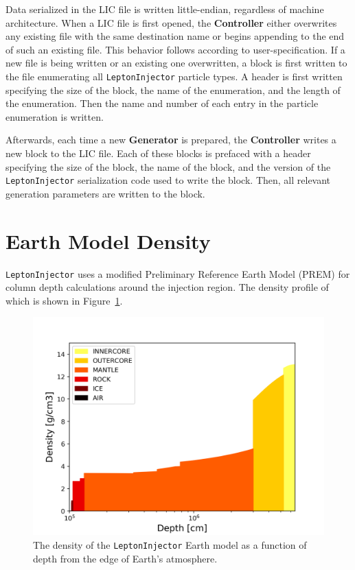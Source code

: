\documentclass[main.tex]{subfiles}
\newcommand{\LeptonInjector}{\texttt{LeptonInjector}}
\begin{document}
Data serialized in the LIC file is written little-endian, regardless of machine architecture. 
When a LIC file is first opened, the \textbf{Controller} either overwrites any existing file with the same destination name or begins appending to the end of such an existing file. 
This behavior follows according to user-specification. 
If a new file is being written or an existing one overwritten, a block is first written to the file enumerating all \LeptonInjector{} particle types. 
A header is first written specifying the size of the block, the name of the enumeration, and the length of the enumeration. 
Then the name and number of each entry in the particle enumeration is written. 

Afterwards, each time a new \textbf{Generator} is prepared, the \textbf{Controller} writes a new block to the LIC file. 
Each of these blocks is prefaced with a header specifying the size of the block, the name of the block, and the version of the \LeptonInjector{} serialization code used to write the block. 
Then, all relevant generation parameters are written to the block. 
\section{Earth Model Density\label{sec:earthdensity}}

\LeptonInjector{} uses a modified Preliminary Reference Earth Model (PREM) for column depth calculations around the injection region. The density profile of which is shown in Figure~\ref{fig:earth_density}.

\begin{figure}[th!]
    \centering
    \includegraphics[width=0.8\linewidth]{figures/earth_density.png}
    \caption{The density of the \LeptonInjector{} Earth model as a function of depth from the edge of Earth's atmosphere.}
    \label{fig:earth_density}
\end{figure}
\end{document}
